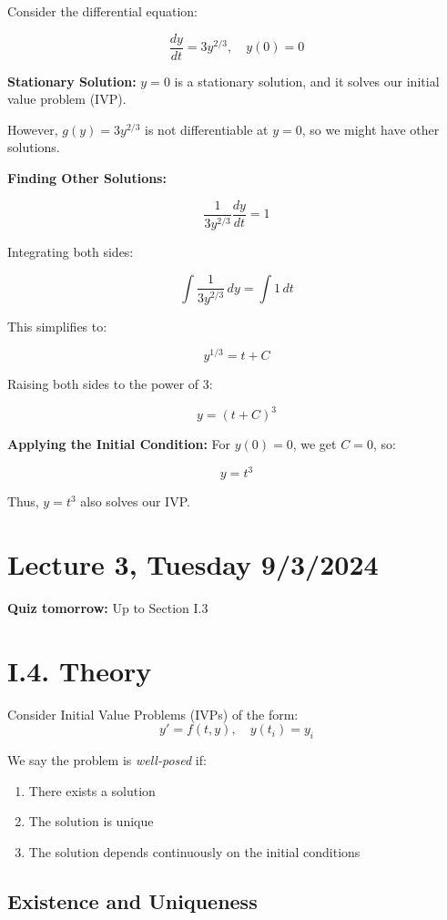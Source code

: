 \documentclass{article}
\begin{document}
Consider the differential equation:

\[
\frac{dy}{dt} = 3y^{2/3}, \quad y(0) = 0
\]

\textbf{Stationary Solution:}  
\( y = 0 \) is a stationary solution, and it solves our initial value problem (IVP).

However, \( g(y) = 3y^{2/3} \) is not differentiable at \( y = 0 \), so we might have other solutions.

\textbf{Finding Other Solutions:}

\[
\frac{1}{3y^{2/3}} \frac{dy}{dt} = 1
\]

Integrating both sides:

\[
\int \frac{1}{3y^{2/3}} \, dy = \int 1 \, dt
\]

This simplifies to:

\[
y^{1/3} = t + C
\]

Raising both sides to the power of 3:

\[
y = (t + C)^3
\]

\textbf{Applying the Initial Condition:}  
For \( y(0) = 0 \), we get \( C = 0 \), so:

\[
y = t^3
\]

Thus, \( y = t^3 \) also solves our IVP.


\section*{Lecture 3, Tuesday 9/3/2024}


\textbf{Quiz tomorrow:} Up to Section I.3

\section*{I.4. Theory}

Consider Initial Value Problems (IVPs) of the form:
\[
y' = f(t,y), \quad y(t_i) = y_i
\]

We say the problem is \textit{well-posed} if:

\begin{enumerate}
    \item There exists a solution
    \item The solution is unique
    \item The solution depends continuously on the initial conditions
\end{enumerate}

\subsection*{Existence and Uniqueness}
\end{document}

